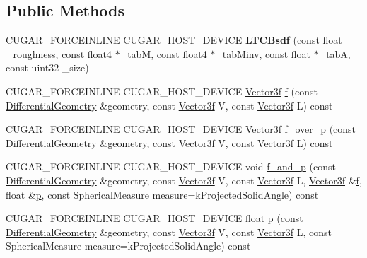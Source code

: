 \subsection*{Public Methods}
\begin{DoxyCompactItemize}
\item 
\mbox{\label{structcugar_1_1_l_t_c_bsdf_a37a98692337291e04a76e0f9801032ca}} 
C\+U\+G\+A\+R\+\_\+\+F\+O\+R\+C\+E\+I\+N\+L\+I\+NE C\+U\+G\+A\+R\+\_\+\+H\+O\+S\+T\+\_\+\+D\+E\+V\+I\+CE {\bfseries L\+T\+C\+Bsdf} (const float \+\_\+roughness, const float4 $\ast$\+\_\+tabM, const float4 $\ast$\+\_\+tab\+Minv, const float $\ast$\+\_\+tabA, const uint32 \+\_\+size)
\item 
C\+U\+G\+A\+R\+\_\+\+F\+O\+R\+C\+E\+I\+N\+L\+I\+NE C\+U\+G\+A\+R\+\_\+\+H\+O\+S\+T\+\_\+\+D\+E\+V\+I\+CE \hyperlink{structcugar_1_1_vector}{Vector3f} \hyperlink{structcugar_1_1_l_t_c_bsdf_a17cf80e7ca7bc8d41108bb11d4b53513}{f} (const \hyperlink{structcugar_1_1_differential_geometry}{Differential\+Geometry} \&geometry, const \hyperlink{structcugar_1_1_vector}{Vector3f} V, const \hyperlink{structcugar_1_1_vector}{Vector3f} L) const
\item 
C\+U\+G\+A\+R\+\_\+\+F\+O\+R\+C\+E\+I\+N\+L\+I\+NE C\+U\+G\+A\+R\+\_\+\+H\+O\+S\+T\+\_\+\+D\+E\+V\+I\+CE \hyperlink{structcugar_1_1_vector}{Vector3f} \hyperlink{structcugar_1_1_l_t_c_bsdf_a42c9dcd589647a78da3a1fedfc188907}{f\+\_\+over\+\_\+p} (const \hyperlink{structcugar_1_1_differential_geometry}{Differential\+Geometry} \&geometry, const \hyperlink{structcugar_1_1_vector}{Vector3f} V, const \hyperlink{structcugar_1_1_vector}{Vector3f} L) const
\item 
C\+U\+G\+A\+R\+\_\+\+F\+O\+R\+C\+E\+I\+N\+L\+I\+NE C\+U\+G\+A\+R\+\_\+\+H\+O\+S\+T\+\_\+\+D\+E\+V\+I\+CE void \hyperlink{structcugar_1_1_l_t_c_bsdf_a675629e6ee797ed3c491c1bad4c13844}{f\+\_\+and\+\_\+p} (const \hyperlink{structcugar_1_1_differential_geometry}{Differential\+Geometry} \&geometry, const \hyperlink{structcugar_1_1_vector}{Vector3f} V, const \hyperlink{structcugar_1_1_vector}{Vector3f} L, \hyperlink{structcugar_1_1_vector}{Vector3f} \&\hyperlink{structcugar_1_1_l_t_c_bsdf_a17cf80e7ca7bc8d41108bb11d4b53513}{f}, float \&\hyperlink{structcugar_1_1_l_t_c_bsdf_a0e537e0db592b6bbc37bdae20b575ea3}{p}, const Spherical\+Measure measure=k\+Projected\+Solid\+Angle) const
\item 
C\+U\+G\+A\+R\+\_\+\+F\+O\+R\+C\+E\+I\+N\+L\+I\+NE C\+U\+G\+A\+R\+\_\+\+H\+O\+S\+T\+\_\+\+D\+E\+V\+I\+CE float \hyperlink{structcugar_1_1_l_t_c_bsdf_a0e537e0db592b6bbc37bdae20b575ea3}{p} (const \hyperlink{structcugar_1_1_differential_geometry}{Differential\+Geometry} \&geometry, const \hyperlink{structcugar_1_1_vector}{Vector3f} V, const \hyperlink{structcugar_1_1_vector}{Vector3f} L, const Spherical\+Measure measure=k\+Projected\+Solid\+Angle) const

\end{DoxyCompactItemize}
